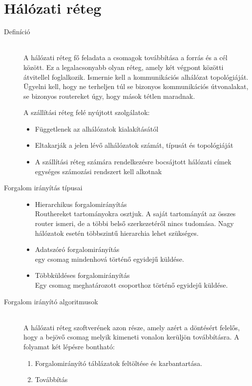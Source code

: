 \documentclass[margin=0px]{article}
\begin{document}
\section{Hálózati réteg}
\begin{description}
    \item[Definíció] \hfill \\
        A hálózati réteg fő feladata a csomagok továbbítása a forrás és a cél között. Ez a legalacsonyabb olyan réteg, amely két végpont közötti átvitellel foglalkozik. Ismernie kell a kommunikációs alhálózat topológiáját. Ügyelni kell, hogy ne terheljen túl se bizonyos kommunikációs útvonalakat, se bizonyos routereket úgy, hogy mások tétlen maradnak.

        A szállítási réteg felé nyújtott szolgálatok:
        \begin{itemize}
            \item Függetlenek az alhálózatok kialakításától
            \item Eltakarják a jelen lévő alhálózatok számát, típusát és topológiáját
            \item A szállítási réteg számára rendelkezésre bocsájtott hálózati címek egységes számozási rendszert kell alkotnak
        \end{itemize}
    \item[Forgalom irányítás típusai] \hfill
        \begin{itemize}
            \item Hierarchikus forgalomirányítás\\
                  Routhereket tartományokra osztjuk. A saját tartományát az összes router ismeri, de a többi belső szerkezetéről nincs tudomása. Nagy hálózatok esetén többszintű hierarchia lehet szükséges.
            \item Adatszóró forgalomirányítás\\
                  egy csomag mindenhová történő egyidejű küldése.
            \item Többküldéses forgalomirányítás\\
                  Egy csomag meghatározott csoporthoz történő egyidejű küldése.

        \end{itemize}

    \item[Forgalom irányító algoritmusok] \hfill \\
        A hálózati réteg szoftverének azon része, amely azért a döntésért felelős, hogy a bejövő csomag melyik kimeneti vonalon kerüljön továbbításra. A folyamat két lépésre bontható:
        \begin{enumerate}
            \item Forgalomirányító táblázatok feltöltése és karbantartása.
            \item Továbbítás
        \end{enumerate}


\end{description}
\end{document}
